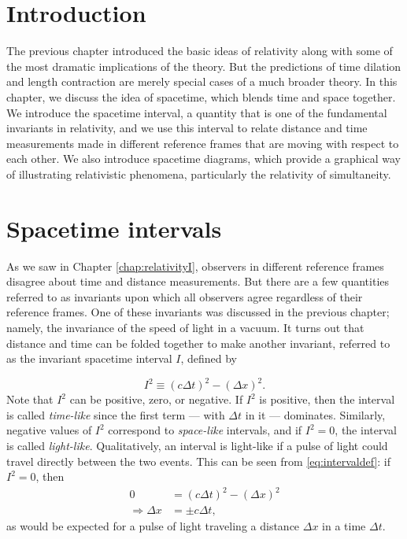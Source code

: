 \section{Introduction}


The previous chapter introduced the basic ideas of relativity along
with some of the most dramatic implications of the theory.  But the
predictions of time dilation and length contraction are merely special
cases of a much broader theory.  In this chapter, we discuss the idea
of spacetime, which blends time and space together.  We introduce the
spacetime interval, a quantity that is one of the fundamental
invariants in relativity, and we use this interval to relate distance
and time measurements made in different reference frames that 
are moving with respect to each other.  We also introduce
spacetime diagrams, which provide a graphical way of illustrating
relativistic phenomena, particularly the relativity of simultaneity.
    

\section{Spacetime intervals}

\label{sec:spacetime_intervals}

As we saw in Chapter \ref{chap:relativityI}, observers in different reference frames
disagree about time and distance measurements.  But there are a few
quantities referred to as invariants upon which all observers agree
regardless of their reference frames.  One of these invariants was
discussed in the previous chapter; namely, the invariance of the speed
of light in a vacuum.  It turns out that distance and time can be
folded together to make another invariant, referred to as the
invariant spacetime interval $I$, defined by

\begin{equation}
I^2 \equiv \left(c\Delta t\right)^2 - \left(\Delta x\right)^2.
\label{eq:intervaldef}
\end{equation}
Note that $I^2$ can be positive, zero, or negative.  If $I^2$ is
positive, then the interval is called \emph{time-like}  since the first term
--- with $\Delta t$ in it --- dominates.  Similarly, negative values
of $I^2$ correspond to \emph{space-like} intervals, and if $I^2 = 0$, the
interval is called \emph{light-like}.  Qualitatively, an interval is light-like
if a pulse of light could travel directly between the two events.
This can be seen from \eqref{eq:intervaldef}: if $I^2 = 0$, then
\begin{align}
0 &= \left(c\Delta t\right)^2 - \left(\Delta x\right)^2   \\
\Rightarrow \Delta x &= \pm c \Delta t,
\end{align}
as would be expected for a pulse of light traveling a distance $\Delta
x$ in a time $\Delta t$.

